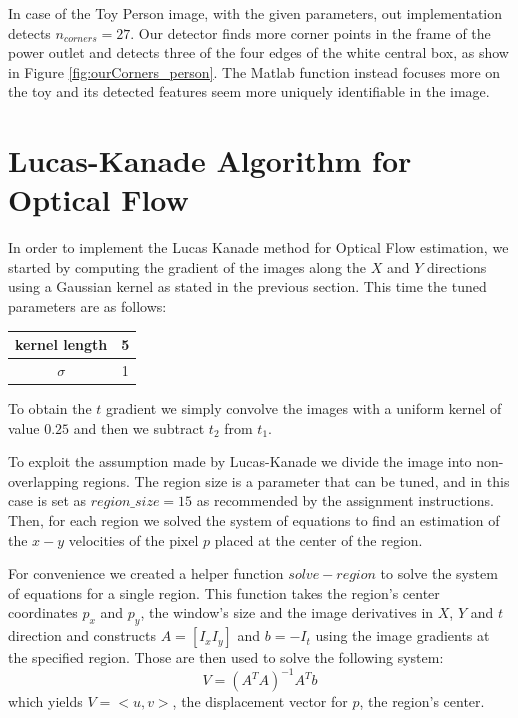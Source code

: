 \documentclass[11pt]{article}
\begin{document}
In case of the Toy Person image, with the given parameters, out implementation
detects $n_{corners} = 27$. Our detector finds more corner points in the frame
of the power outlet and detects three of the four edges of the white central
box, as show in Figure \ref{fig:ourCorners_person}. The Matlab function
instead focuses more on the toy and its detected features seem more uniquely
identifiable in the image.

\section{Lucas-Kanade Algorithm for Optical Flow}
In order to implement the Lucas Kanade method for Optical Flow estimation, we started by
computing the gradient of the images along the $X$ and $Y$ directions using a Gaussian
kernel as stated in the previous section. This time the tuned parameters are as follows: 

\begin{center}
	\begin{tabular}{| c | c |}
		\hline
		\textbf{kernel length} & 5   \\ \hline
		\textbf{$\sigma$}      & 1  \\ 
		\hline
	\end{tabular}
\end{center}

To obtain the $t$ gradient we simply convolve the images with a uniform kernel
of value $0.25$ and then we subtract $t_2$ from $t_1$.

To exploit the assumption made by Lucas-Kanade we divide the image into
non-overlapping regions. The region size is a parameter that can be tuned, and
in this case is set as $region\_size= 15$ as recommended by the assignment
instructions. Then, for each region we solved the system of equations to find an
estimation of the $x-y$ velocities of the pixel $p$ placed at the center of the
region.

For convenience we created a helper function $solve-region$ to solve the system
of equations for a single region. This function takes the region's center
coordinates $p_x$ and $p_y$, the window's size and the image derivatives in $X$,
$Y$ and $t$ direction and constructs $A = [I_x I_y]$ and $b = -I_t$ using the
image gradients at the specified region. Those are then used to solve the
following system:
$$V = (A^TA)^{-1}A^Tb$$
which yields $V = <u, v>$, the displacement vector for $p$, the region's center.
\end{document}
